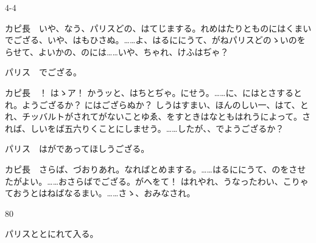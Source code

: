 \documentclass[tate,paper=b6j,jafontsize=9pt]{jlreq}
\begin{document}
\begin{azconvIndented}{4\zw}{-4\zw}

カピ長　いや、なう、パリスどの、はてじまする。れめはたりとものにはくまいでござる、いや、はもひさぬ。……よ、はるににうて、がねパリスどのゝいのをらせて、よいかの、のには……いや、ちゃれ、けふはぢゃ？

パリス　でござる。

カピ長　！ はゝア！ かうッと、はちとぢゃ。にせう。……に、にはとさするとれ。ようござるか？ にはござらぬか？ しうはすまい、ほんのしい一、はて、とれ、チッバルトがされてがないことゆゑ、をすときはなともはれうによって。されば、しいをば五六りくことにしませう。……したが、、でようござるか？

パリス　はがであってほしうござる。

カピ長　さらば、づおりあれ。なればとめまする。……はるににうて、のをさせたがよい。……おさらばでござる。がへをて！ はれやれ、うなったわい、こりゃておうとはねばなるまい。……さゝ、おみなされ。

\end{azconvIndented}
\begin{azconvIndented}{8\zw}{0\zw}

パリスととにれて入る。

\end{azconvIndented}
\end{document}
